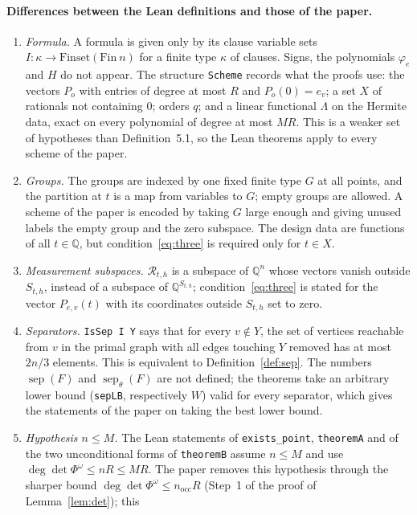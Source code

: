 \documentclass[11pt,a4paper]{article}
\theoremstyle{definition}
\theoremstyle{remark}
\newcommand{\Q}{\mathbb{Q}}
\newcommand{\cR}{\mathcal{R}}
\newcommand{\sep}{\operatorname{sep}}
\newcommand{\sepw}{\operatorname{sep}_{\theta}}
\newcommand{\nocc}{n_{\mathrm{occ}}}
\begin{document}
\paragraph{Differences between the Lean definitions and those of the paper.}
\begin{enumerate}
\item \emph{Formula.} A formula is given only by its clause variable sets
 $I:\kappa\to\mathrm{Finset}(\mathrm{Fin}\ n)$ for a finite type $\kappa$ of clauses. Signs,
 the polynomials $\varphi_e$ and $H$ do not appear. The structure \texttt{Scheme} records
 what the proofs use: the vectors $P_o$ with entries of degree at most $R$ and
 $P_o(0)=e_v$; a set $X$ of rationals not containing $0$; orders $q$; and a linear functional
 $\Lambda$ on the Hermite data, exact on every polynomial of degree at most $MR$. This is a
 weaker set of hypotheses than Definition~5.1, so the Lean theorems apply to every scheme of
 the paper.
\item \emph{Groups.} The groups are indexed by one fixed finite type $G$ at all points, and
 the partition at $t$ is a map from variables to $G$; empty groups are allowed. A scheme of
 the paper is encoded by taking $G$ large enough and giving unused labels the empty group
 and the zero subspace. The design data are functions of all $t\in\Q$, but
 condition~\eqref{eq:three} is required only for $t\in X$.
\item \emph{Measurement subspaces.} $\cR_{t,h}$ is a subspace of $\Q^n$ whose vectors vanish
 outside $S_{t,h}$, instead of a subspace of $\Q^{S_{t,h}}$; condition~\eqref{eq:three} is
 stated for the vector $P_{e,v}(t)$ with its coordinates outside $S_{t,h}$ set to zero.
\item \emph{Separators.} \texttt{IsSep I Y} says that for every $v\notin Y$, the set of
 vertices reachable from $v$ in the primal graph with all edges touching $Y$ removed has at
 most $2n/3$ elements. This is equivalent to Definition~\ref{def:sep}. The numbers
 $\sep(F)$ and $\sepw(F)$ are not defined; the theorems take an arbitrary lower bound
 (\texttt{sepLB}, respectively $W$) valid for every separator, which gives the statements
 of the paper on taking the best lower bound.
\item \emph{Hypothesis $n\le M$.} The Lean statements of \texttt{exists\_point},
 \texttt{theoremA} and of the two unconditional forms of \texttt{theoremB} assume $n\le M$ and use
 $\deg\det\Phi^\omega\le nR\le MR$. The paper removes this hypothesis through the sharper
 bound $\deg\det\Phi^\omega\le\nocc R$ (Step~1 of the proof of Lemma~\ref{lem:det}); this

\end{enumerate}
\end{document}
